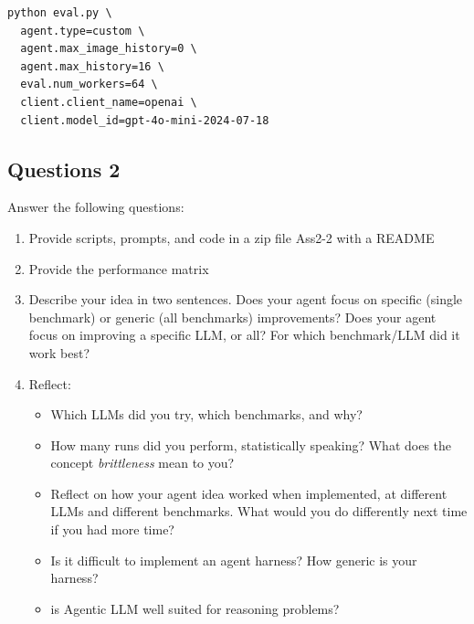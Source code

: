 \documentclass[a4]{article}
\begin{document}
\begin{listing}
    \begin{verbatim}
python eval.py \
  agent.type=custom \
  agent.max_image_history=0 \
  agent.max_history=16 \
  eval.num_workers=64 \
  client.client_name=openai \
  client.model_id=gpt-4o-mini-2024-07-18        
    \end{verbatim}
    \caption{Running the Agent  evaluation}\label{lst:agent-run}
\end{listing}


\subsection{Questions 2}
Answer the following questions:
\begin{enumerate}
\item Provide scripts, prompts, and code in a zip file Ass2-2 with a README
\item Provide the performance matrix
\item Describe your idea in two sentences. Does your agent focus on  specific (single benchmark) or generic (all benchmarks) improvements?  Does your agent focus on improving a specific LLM, or all?  For which benchmark/LLM did it work best?
\item Reflect: 
\begin{itemize} 
\item Which LLMs did you try, which benchmarks, and why? 
\item How many runs did you perform, statistically speaking? What does the concept {\em brittleness} mean to you?
\item Reflect on how your agent idea worked when implemented, at different LLMs and different benchmarks.  What would you do differently next time if you had more time?
\item Is it difficult to implement an agent harness? How generic is your harness?
\item is Agentic LLM well suited for reasoning problems? 
\end{itemize}
\end{enumerate}
\end{document}

